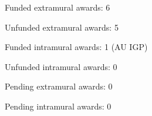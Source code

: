 \begin{veryTightItemize}
    \item Funded extramural awards: 6
    \item Unfunded extramural awards: 5
    \item Funded intramural awards: 1 (AU IGP)
    \item Unfunded intramural awards: 0
    \item Pending extramural awards: 0
    \item Pending intramural awards: 0
\end{veryTightItemize}
